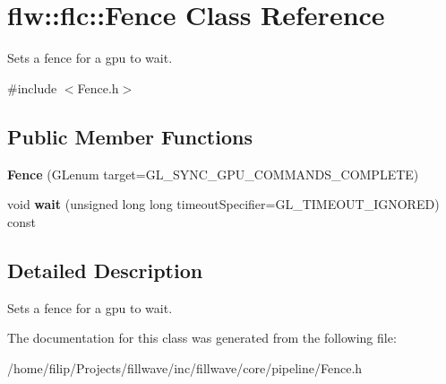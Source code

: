 \hypertarget{classflw_1_1flc_1_1Fence}{}\section{flw\+:\+:flc\+:\+:Fence Class Reference}
\label{classflw_1_1flc_1_1Fence}


Sets a fence for a gpu to wait.  




{\ttfamily \#include $<$Fence.\+h$>$}

\subsection*{Public Member Functions}
\begin{DoxyCompactItemize}
\item 
{\bfseries Fence} (G\+Lenum target=G\+L\+\_\+\+S\+Y\+N\+C\+\_\+\+G\+P\+U\+\_\+\+C\+O\+M\+M\+A\+N\+D\+S\+\_\+\+C\+O\+M\+P\+L\+E\+TE)\hypertarget{classflw_1_1flc_1_1Fence_a431a609115c5a2965b7e778897c7df7a}{}\label{classflw_1_1flc_1_1Fence_a431a609115c5a2965b7e778897c7df7a}

\item 
void {\bfseries wait} (unsigned long long timeout\+Specifier=G\+L\+\_\+\+T\+I\+M\+E\+O\+U\+T\+\_\+\+I\+G\+N\+O\+R\+ED) const \hypertarget{classflw_1_1flc_1_1Fence_ad601be22bab63d832cbe40fb333d1678}{}\label{classflw_1_1flc_1_1Fence_ad601be22bab63d832cbe40fb333d1678}

\end{DoxyCompactItemize}


\subsection{Detailed Description}
Sets a fence for a gpu to wait. 

The documentation for this class was generated from the following file\+:\begin{DoxyCompactItemize}
\item 
/home/filip/\+Projects/fillwave/inc/fillwave/core/pipeline/Fence.\+h\end{DoxyCompactItemize}
